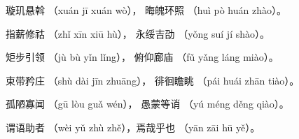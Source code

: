 \documentclass[12pt]{article}%
\begin{document}
\begin{appendices}
\begin{subappendix}
\begin{center}
璇玑悬斡 （xuán jī xuán wò）， 晦魄环照 （huì pò huán zhào）。

指薪修祜 （zhǐ xīn xiū hù）， 永绥吉劭 （yǒng suí jí shào）。

矩步引领 （jù bù yǐn lǐng）， 俯仰廊庙 （fǔ yǎng láng miào）。

束带矜庄 （shù dài jīn zhuāng）， 徘徊瞻眺 （pái huái zhān tiào）。

孤陋寡闻 （gū lòu guǎ wén）， 愚蒙等诮 （yú méng děng qiào）。

谓语助者 （wèi yǔ zhù zhě），焉哉乎也 （yān zāi hū yě）。
\end{center}
\end{subappendix}

\end{appendices}
\end{document}
